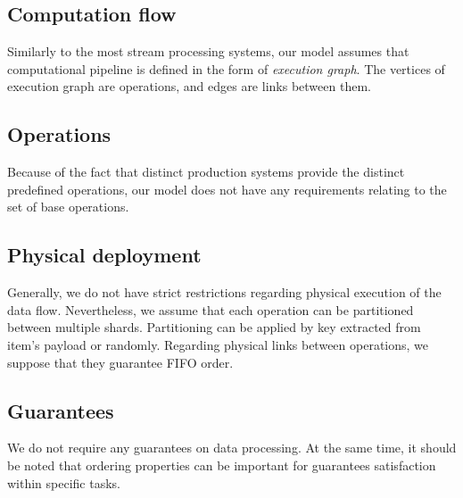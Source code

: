 \subsection{Computation flow}
Similarly to the most stream processing systems, our model assumes that computational pipeline is defined in the form of {\it execution graph}. The vertices of execution graph are operations, and edges are links between them. 

\subsection{Operations}
Because of the fact that distinct production systems provide the distinct predefined operations, our model does not have any requirements relating to the set of base operations.

\subsection{Physical deployment}
Generally, we do not have strict restrictions regarding physical execution of the data flow. Nevertheless, we assume that each operation can be partitioned between multiple shards. Partitioning can be applied by key extracted from item's payload or randomly. Regarding physical links between operations, we suppose that they guarantee FIFO order.

\subsection{Guarantees}
We do not require any guarantees on data processing. At the same time, it should be noted that ordering properties can be important for guarantees satisfaction within specific tasks.